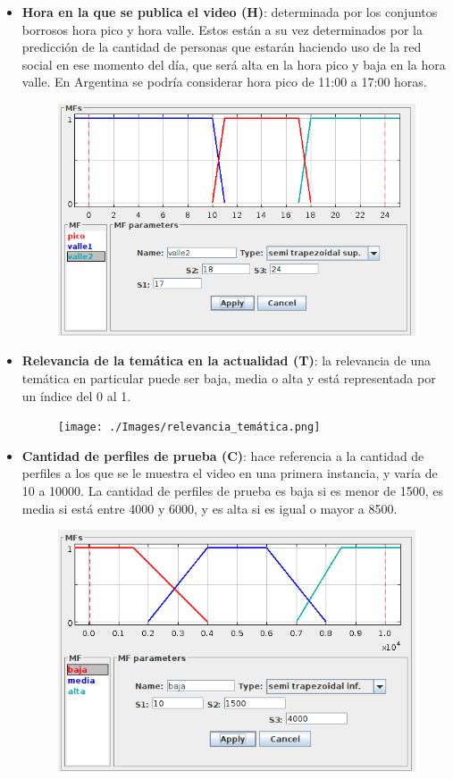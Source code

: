 \documentclass{article}
\begin{document}
\begin{itemize}
	\item \textbf{Hora en la que se publica el video (H)}: determinada por los conjuntos borrosos hora pico y hora valle. Estos están a su vez determinados por la predicción de la cantidad de personas que estarán haciendo uso de la red social en ese momento del día, que será alta en la hora pico y baja en la hora valle. En Argentina se podría considerar hora pico de 11:00 a 17:00 horas.
	\begin{figure}[H]
		\centering
		\includegraphics[scale=0.5]{./Images/hora_publicacion.png}
	\end{figure}
	\item \textbf{Relevancia de la temática en la actualidad (T)}: la relevancia de una temática en particular puede ser baja, media o alta y está representada por un índice del 0 al 1.
	\begin{figure}[H]
		\centering
		\texttt{[image: ./Images/relevancia\_temática.png]}
	\end{figure}
	\item \textbf{Cantidad de perfiles de prueba (C)}: hace referencia a la cantidad de perfiles a los que se le muestra el video en una primera instancia, y varía de 10 a 10000. La cantidad de perfiles de prueba es baja si es menor de 1500, es media si está entre 4000 y 6000, y es alta si es igual o mayor a 8500.
	\begin{figure}[H]
		\centering
		\includegraphics[scale=0.5]{./Images/perfiles_prueba_cant.png}

\end{figure}
\end{itemize}
\end{document}
